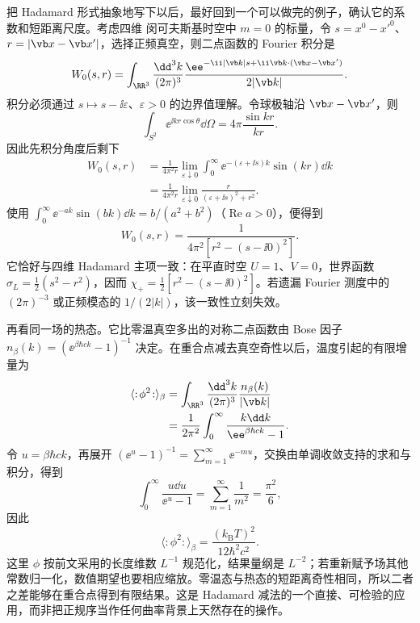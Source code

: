把 Hadamard 形式抽象地写下以后，最好回到一个可以做完的例子，确认它的系数和短距离尺度。考虑四维 闵可夫斯基时空中 $m=0$ 的标量，令 $s=x^0-x'^0$、$r=|\vb x-\vb x'|$，选择正频真空，则二点函数的 Fourier 积分是
\begin{equation}\label{eq:ghs-r6-flat-vacuum-fourier}
W_0(s,r)=\int_{\RR^3}\frac{\dd^3k}{(2\pi)^3}
\frac{\ee^{-\ii|\vb k|s+\ii\vb k\cdot(\vb x-\vb x')}}{2|\vb k|}.
\end{equation}
积分必须通过 $s\mapsto s-\ii\varepsilon$、$\varepsilon>0$ 的边界值理解。令球极轴沿 $\vb x-\vb x'$，则
\[
\int_{S^2}\ee^{\ii kr\cos\theta}\dd\Omega
=4\pi\frac{\sin kr}{kr}.
\]
因此先积分角度后剩下
\begin{align*}
W_0(s,r)
&=\frac{1}{4\pi^2r}\lim_{\varepsilon\downarrow0}
\int_0^\infty\ee^{-(\varepsilon+\ii s)k}\sin(kr)\dd k\\
&=\frac{1}{4\pi^2r}\lim_{\varepsilon\downarrow0}
\frac{r}{(\varepsilon+\ii s)^2+r^2}.
\end{align*}
使用 $\int_0^\infty\ee^{-ak}\sin(bk)\dd k=b/(a^2+b^2)$（$\operatorname{Re}a>0$），便得到
\begin{equation}\label{eq:ghs-r6-flat-massless-wightman}
W_0(s,r)=\frac{1}{4\pi^2[r^2-(s-\ii0)^2]}.
\end{equation}
它恰好与四维 Hadamard 主项一致：在平直时空 $U=1$、$V=0$，世界函数 $\sigma_L=\tfrac12(s^2-r^2)$，因而 $\chi_+=\tfrac12[r^2-(s-\ii0)^2]$。若遗漏 Fourier 测度中的 $(2\pi)^{-3}$ 或正频模态的 $1/(2|k|)$，该一致性立刻失效。

再看同一场的热态。它比零温真空多出的对称二点函数由 Bose 因子
$n_\beta(k)=(\ee^{\beta\hbar c k}-1)^{-1}$ 决定。在重合点减去真空奇性以后，温度引起的有限增量为
\begin{align*}
\langle:\!\phi^2\!:\rangle_\beta
&=\int_{\RR^3}\frac{\dd^3k}{(2\pi)^3}\frac{n_\beta(k)}{|\vb k|}\\
&=\frac1{2\pi^2}\int_0^\infty\frac{k\dd k}{\ee^{\beta\hbar ck}-1}.
\end{align*}
令 $u=\beta\hbar ck$，再展开 $(\ee^u-1)^{-1}=\sum_{m=1}^\infty\ee^{-mu}$，交换由单调收敛支持的求和与积分，得到
\[
\int_0^\infty\frac{u\dd u}{\ee^u-1}
=\sum_{m=1}^\infty\frac1{m^2}=\frac{\pi^2}{6},
\]
因此
\begin{equation}\label{eq:ghs-r6-thermal-wick-square}
\langle:\!\phi^2\!:\rangle_\beta
=\frac{(k_{\mathrm B}T)^2}{12\hbar^2c^2}.
\end{equation}
这里 $\phi$ 按前文采用的长度维数 $L^{-1}$ 规范化，结果量纲是 $L^{-2}$；若重新赋予场其他常数归一化，数值期望也要相应缩放。零温态与热态的短距离奇性相同，所以二者之差能够在重合点得到有限结果。这是 Hadamard 减法的一个直接、可检验的应用，而非把正规序当作任何曲率背景上天然存在的操作。

